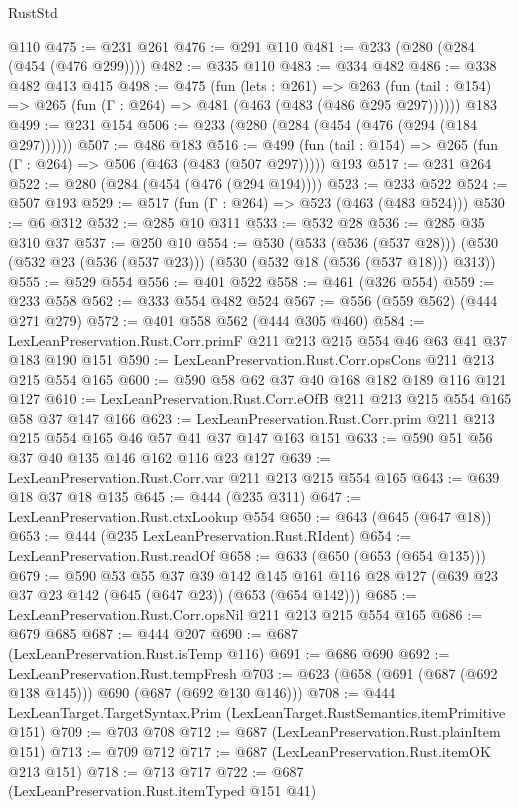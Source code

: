 \begin{lexlean}{RustStd}
\begin{coremodule}
    @110
@475 := @231 @261
@476 := @291 @110
@481 := @233 (@280 (@284 (@454 (@476 @299))))
@482 := @335 @110
@483 := @334 @482
@486 := @338 @482 @413 @415
@498 := @475
    (fun (lets : @261) =>
    @263 (fun (tail : @154) => @265 (fun (Γ : @264) => @481 (@463 (@483 (@486 @295 @297))))))
    @183
@499 := @231 @154
@506 := @233 (@280 (@284 (@454 (@476 (@294 (@184 @297))))))
@507 := @486 @183
@516 := @499 (fun (tail : @154) => @265 (fun (Γ : @264) => @506 (@463 (@483 (@507 @297))))) @193
@517 := @231 @264
@522 := @280 (@284 (@454 (@476 (@294 @194))))
@523 := @233 @522
@524 := @507 @193
@529 := @517 (fun (Γ : @264) => @523 (@463 (@483 @524)))
@530 := @6 @312
@532 := @285 @10 @311
@533 := @532 @28
@536 := @285 @35 @310 @37
@537 := @250 @10
@554 := @530
    (@533 (@536 (@537 @28)))
    (@530 (@532 @23 (@536 (@537 @23))) (@530 (@532 @18 (@536 (@537 @18))) @313))
@555 := @529 @554
@556 := @401 @522
@558 := @461 (@326 @554)
@559 := @233 @558
@562 := @333 @554 @482 @524
@567 := @556 (@559 @562) (@444 @271 @279)
@572 := @401 @558 @562 (@444 @305 @460)
@584 := LexLeanPreservation.Rust.Corr.primF @211 @213 @215 @554 @46 @63 @41 @37 @183 @190 @151
@590 := LexLeanPreservation.Rust.Corr.opsCons @211 @213 @215 @554 @165
@600 := @590 @58 @62 @37 @40 @168 @182 @189 @116 @121 @127
@610 := LexLeanPreservation.Rust.Corr.eOfB @211 @213 @215 @554 @165 @58 @37 @147 @166
@623 := LexLeanPreservation.Rust.Corr.prim @211 @213 @215 @554 @165 @46 @57 @41 @37 @147 @163 @151
@633 := @590 @51 @56 @37 @40 @135 @146 @162 @116 @23 @127
@639 := LexLeanPreservation.Rust.Corr.var @211 @213 @215 @554 @165
@643 := @639 @18 @37 @18 @135
@645 := @444 (@235 @311)
@647 := LexLeanPreservation.Rust.ctxLookup @554
@650 := @643 (@645 (@647 @18))
@653 := @444 (@235 LexLeanPreservation.Rust.RIdent)
@654 := LexLeanPreservation.Rust.readOf
@658 := @633 (@650 (@653 (@654 @135)))
@679 := @590
    @53
    @55
    @37
    @39
    @142
    @145
    @161
    @116
    @28
    @127
    (@639 @23 @37 @23 @142 (@645 (@647 @23)) (@653 (@654 @142)))
@685 := LexLeanPreservation.Rust.Corr.opsNil @211 @213 @215 @554 @165
@686 := @679 @685
@687 := @444 @207
@690 := @687 (LexLeanPreservation.Rust.isTemp @116)
@691 := @686 @690
@692 := LexLeanPreservation.Rust.tempFresh
@703 := @623 (@658 (@691 (@687 (@692 @138 @145))) @690 (@687 (@692 @130 @146)))
@708 := @444 LexLeanTarget.TargetSyntax.Prim (LexLeanTarget.RustSemantics.itemPrimitive @151)
@709 := @703 @708
@712 := @687 (LexLeanPreservation.Rust.plainItem @151)
@713 := @709 @712
@717 := @687 (LexLeanPreservation.Rust.itemOK @213 @151)
@718 := @713 @717
@722 := @687 (LexLeanPreservation.Rust.itemTyped @151 @41)

\end{coremodule}
\end{lexlean}
